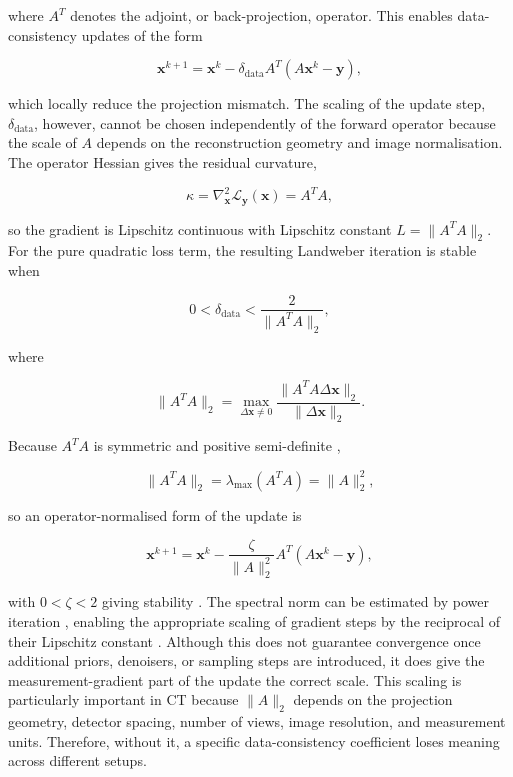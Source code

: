 where $A^T$ denotes the adjoint, or back-projection, operator. This enables data-consistency updates of the form

\begin{equation}
\mathbf{x}^{k+1}
=
\mathbf{x}^k
-
\delta_{\mathrm{data}}
A^T(A\mathbf{x}^k-\mathbf{y}),
\label{eq:data_consistency_update}
\end{equation}

which locally reduce the projection mismatch. The scaling of the update step, $\delta_\text{data}$, however, cannot be chosen independently of the forward operator because the scale of $A$ depends on the reconstruction geometry and image normalisation. The operator Hessian gives the residual curvature,

\begin{equation}
\kappa=\nabla_{\mathbf{x}}^2\mathcal{L}_{\mathbf{y}}(\mathbf{x})
=
A^TA,
\label{eq:data_loss_hessian}
\end{equation}

so the gradient is Lipschitz continuous with Lipschitz constant $L=\|A^TA\|_2$. For the pure quadratic loss term, the resulting Landweber iteration is stable when \cite{hansen_discrete_2010}

\begin{equation}
0<\delta_{\mathrm{data}}<\frac{2}{\|A^TA\|_2},
\label{eq:data_step_stability}
\end{equation}

where 

\begin{equation}
\|A^TA\|_2
=
\max_{\Delta\mathbf{x}\neq 0}
\frac{
\|A^TA\Delta\mathbf{x}\|_2
}{
\|\Delta\mathbf{x}\|_2
}.
\label{eq:operator_norm_definition}
\end{equation}

Because $A^TA$ is symmetric and positive semi-definite \cite{golub_matrix_2012},

\begin{equation}
\|A^TA\|_2
=
\lambda_{\max}(A^TA)
=
\|A\|_2^2,
\label{eq:operator_norm_relation}
\end{equation}

so an operator-normalised form of the update is

\begin{equation}
\mathbf{x}^{k+1}
=
\mathbf{x}^k
-
\frac{\zeta}{\|A\|_2^2}
A^T(A\mathbf{x}^k-\mathbf{y}),
\label{eq:scaled_data_consistency_update}
\end{equation}

with $0<\zeta<2$ giving stability \cite{hansen_discrete_2010}. The spectral norm can be estimated by power iteration \cite{golub_matrix_2012}, enabling the appropriate scaling of gradient steps by the reciprocal of their Lipschitz constant \cite{beck_fast_2009}. Although this does not guarantee convergence once additional priors, denoisers, or sampling steps are introduced, it does give the measurement-gradient part of the update the correct scale. This scaling is particularly important in CT because $\|A\|_2$ depends on the projection geometry, detector spacing, number of views, image resolution, and measurement units. Therefore, without it, a specific data-consistency coefficient loses meaning across different setups.

